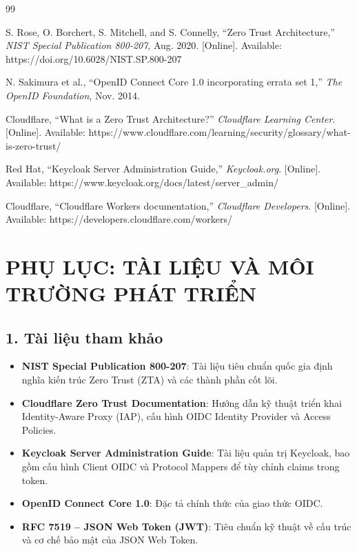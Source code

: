 \newpage
\begin{thebibliography}{99}

S. Rose, O. Borchert, S. Mitchell, and S. Connelly, ``Zero Trust Architecture,'' \textit{NIST Special Publication 800-207}, Aug. 2020. [Online]. Available: https://doi.org/10.6028/NIST.SP.800-207

N. Sakimura et al., ``OpenID Connect Core 1.0 incorporating errata set 1,'' \textit{The OpenID Foundation}, Nov. 2014.

Cloudflare, ``What is a Zero Trust Architecture?'' \textit{Cloudflare Learning Center}. [Online]. Available: https://www.cloudflare.com/learning/security/glossary/what-is-zero-trust/

Red Hat, ``Keycloak Server Administration Guide,'' \textit{Keycloak.org}. [Online]. Available: https://www.keycloak.org/docs/latest/server\_admin/

Cloudflare, ``Cloudflare Workers documentation,'' \textit{Cloudflare Developers}. [Online]. Available: https://developers.cloudflare.com/workers/

\end{thebibliography}
\newpage
\section*{PHỤ LỤC: TÀI LIỆU VÀ MÔI TRƯỜNG PHÁT TRIỂN}

\subsection*{1. Tài liệu tham khảo}

\begin{itemize}
\item \textbf{NIST Special Publication 800-207}: Tài liệu tiêu chuẩn quốc gia định nghĩa kiến trúc Zero Trust (ZTA) và các thành phần cốt lõi.
\item \textbf{Cloudflare Zero Trust Documentation}: Hướng dẫn kỹ thuật triển khai Identity-Aware Proxy (IAP), cấu hình OIDC Identity Provider và Access Policies.
\item \textbf{Keycloak Server Administration Guide}: Tài liệu quản trị Keycloak, bao gồm cấu hình Client OIDC và Protocol Mappers để tùy chỉnh claims trong token.
\item \textbf{OpenID Connect Core 1.0}: Đặc tả chính thức của giao thức OIDC.
\item \textbf{RFC 7519 -- JSON Web Token (JWT)}: Tiêu chuẩn kỹ thuật về cấu trúc và cơ chế bảo mật của JSON Web Token.
\end{itemize}

